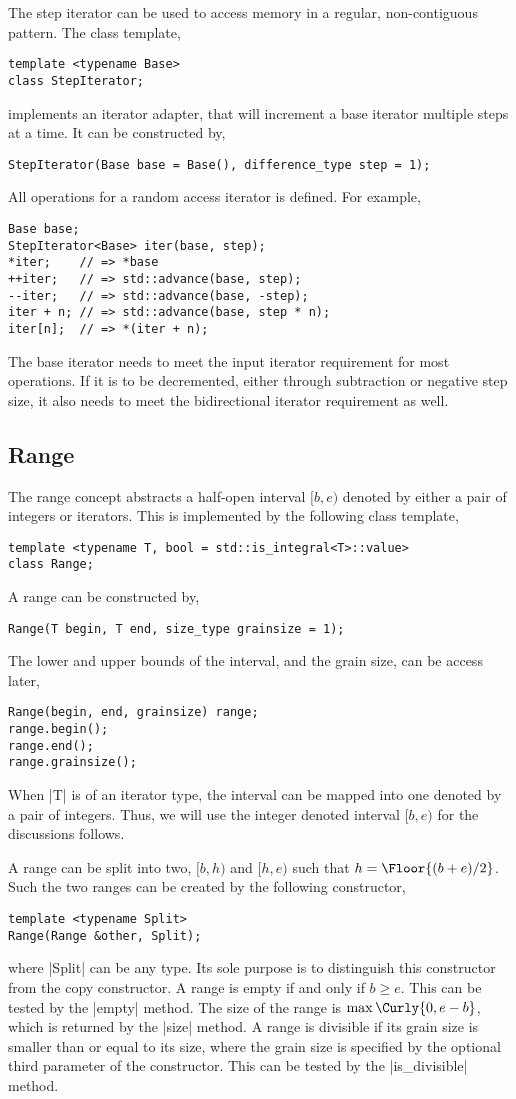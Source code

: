 The step iterator can be used to access memory in a regular, non-contiguous
pattern. The class template,
\begin{verbatim}
template <typename Base>
class StepIterator;
\end{verbatim}
implements an iterator adapter, that will increment a base iterator multiple
steps at a time. It can be constructed by,
\begin{verbatim}
StepIterator(Base base = Base(), difference_type step = 1);
\end{verbatim}
All operations for a random access iterator is defined. For example,
\begin{verbatim}
Base base;
StepIterator<Base> iter(base, step);
*iter;    // => *base
++iter;   // => std::advance(base, step);
--iter;   // => std::advance(base, -step);
iter + n; // => std::advance(base, step * n);
iter[n];  // => *(iter + n);
\end{verbatim}
The base iterator needs to meet the input iterator requirement for most
operations. If it is to be decremented, either through subtraction or negative
step size, it also needs to meet the bidirectional iterator requirement as
well.

\subsection{Range}
\label{sub:Range}

The range concept abstracts a half-open interval $[b, e)$ denoted by either a
pair of integers or iterators. This is implemented by the following class
template,
\begin{verbatim}
template <typename T, bool = std::is_integral<T>::value>
class Range;
\end{verbatim}
A range can be constructed by,
\begin{verbatim}
Range(T begin, T end, size_type grainsize = 1);
\end{verbatim}
The lower and upper bounds of the interval, and the grain size, can be access
later,
\begin{verbatim}
Range(begin, end, grainsize) range;
range.begin();
range.end();
range.grainsize();
\end{verbatim}
When |T| is of an iterator type, the interval can be mapped into one denoted by
a pair of integers. Thus, we will use the integer denoted interval $[b, e)$ for
the discussions follows.

A range can be split into two, $[b, h)$ and $[h, e)$ such that $h = \Floor{(b +
  e) / 2}$. Such the two ranges can be created by the following constructor,
\begin{verbatim}
template <typename Split>
Range(Range &other, Split);
\end{verbatim}
where |Split| can be any type. Its sole purpose is to distinguish this
constructor from the copy constructor. A range is empty if and only if $b \ge
e$. This can be tested by the |empty| method. The size of the range is
$\max\Curly{0, e - b}$, which is returned by the |size| method. A range is
divisible if its grain size is smaller than or equal to its size, where the
grain size is specified by the optional third parameter of the constructor.
This can be tested by the |is_divisible| method.

